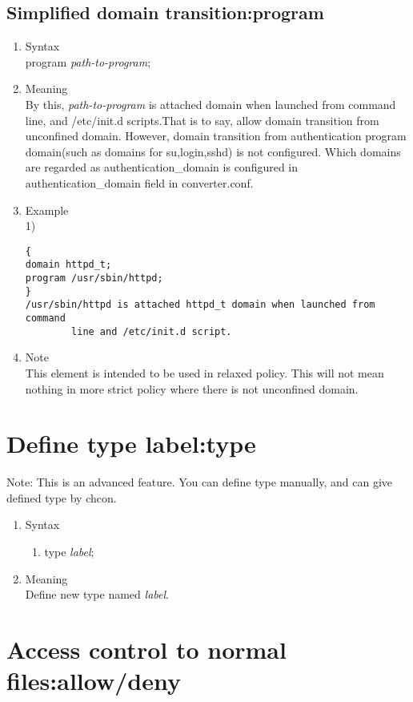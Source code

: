 \documentclass{article}
\begin{document}
\subsection{Simplified domain transition:program}\label{sec:program}
\begin{enumerate}
 \item Syntax\\
    program {\it path-to-program};
 \item Meaning\\
       By this,
       {\it path-to-program} is attached domain when launched from
       command line, and /etc/init.d scripts.That is to
       say, allow domain transition from unconfined domain. 
    However, domain transition from authentication program domain(such as
       domains for su,login,sshd) is not configured. Which domains are
       regarded as authentication\_domain is configured in
       authentication\_domain field in converter.conf.\\
 \item Example\\
1)
\begin{verbatim}
{
domain httpd_t;
program /usr/sbin/httpd;
}
/usr/sbin/httpd is attached httpd_t domain when launched from command
		line and /etc/init.d script.
\end{verbatim}
 \item Note\\
    This element is intended to be used in relaxed policy. This will not
       mean nothing in more strict policy where there is not unconfined domain.
\end{enumerate}

\section{Define type label:type}
Note: This is an advanced feature. 
You can define type manually, and can give defined type by chcon.
\begin{enumerate}
	\item Syntax
		\begin{enumerate}
		\item type {\it label};
		\end{enumerate}
	\item Meaning\\
		Define new type named {\it label}.
\end{enumerate}


\section{Access control to normal files:allow/deny}
\end{document}
